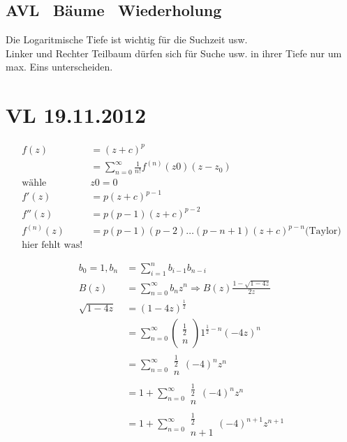 \documentclass[a4paper,twoside,10pt]{report}
\begin{document}
{\section{AVL \, Bäume \, Wiederholung}

Die Logaritmische Tiefe ist wichtig für die Suchzeit usw.\\
Linker und Rechter Teilbaum dürfen sich für Suche usw. in ihrer Tiefe nur um max. Eins unterscheiden.

\chapter{VL 19.11.2012}
\begin{align*}
f(z) &=(z+c)^p \\
&=\sum_{n=0}^\infty \frac{1}{n!}f^{(n)}(z0)(z-z_0)\\
\mbox{wähle }&z0=0\\
f'(z)&=p(z+c)^{p-1}\\
f''(z)&=p(p-1)(z+c)^{p-2}\\
f^{(n)}(z)&=p(p-1)(p-2)\hdots(p-n+1)(z+c)^{p-n}\mbox{(Taylor)}\\
\mbox{hier fehlt was!}
\end{align*}

\begin{align*}
b_0=1,b_n&=\sum_{i=1}^nb_{i-1}b_{n-i}\\
B(z)&=\sum_{n=0}^\infty b_nz^n\Rightarrow B(z)\frac{1-\sqrt{1-4z}}{2z}\\
\sqrt{1-4z}&=(1-4z)^\frac{1}{2}\\
&=\sum_{n=0}^\infty \left(\begin{array}{c}\frac{1}{2}\\n\end{array}\right)1^{\frac{1}{2}-n}(-4z)^n\\
&=\sum_{n=0}^\infty\begin{array}{c}\frac{1}{2}\\n\end{array}(-4)^nz^n\\
&=1+\sum_{n=0}^\infty \begin{array}{c}\frac{1}{2}\\n\end{array}(-4)^nz^n\\
&=1+\sum_{n=0}^\infty \begin{array}{c}\frac{1}{2}\\n+1\end{array}(-4)^{n+1}z^{n+1}
\end{align*}

}
\end{document}
